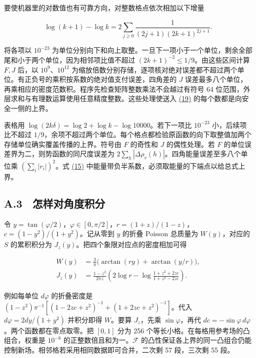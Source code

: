 \documentclass[11pt,a4paper]{article}
\begin{document}
要使机器里的对数值也有可靠方向，对整数格点依次相加以下增量

\[
 \log(k+1)-\log k=2\sum_{j\ge0}\frac{1}{(2j+1)(2k+1)^{2j+1}}.
\]

将各项以 \(10^{-23}\) 为单位分别向下和向上取整。一旦下一项小于一个单位，剩余全部尾和小于两个单位，因为相邻项比值不超过 \((2k+1)^{-2}\le1/9\)。由这些区间计算 \(F,J\) 后，以 \(10^9\)、\(10^{12}\) 为缩放倍数分别存储，逐项核对绝对误差都不超过两个单位。有正负号的乘积按系数的绝对值支付误差，四角差的 \(J\) 误差最多八个单位，再乘相应的密度范数积。程序先检查矩阵整数乘法不会越过有符号 64 位范围，外层求和与有理数运算使用任意精度整数。这些处理使送入 \hyperref[eq:19]{(19)} 的每个数都是向安全一侧的上界。

表格用 \(\log(2k\delta)=\log2+\log k-\log10000\)。若下一项比 \(10^{-23}\) 小，后续项比不超过 \(1/9\)，余项不超过两个单位。每个格点都检验原函数的向下取整值加两个存储单位确实覆盖传播的上界。符号由 \(F\) 的奇性和 \(J\) 的偶性处理。若 \(F\) 的单位误差界为二，则势函数的同尺度误差为 \(2\sum_h|\Delta\rho_v(h)|\)。四角能量误差至多八个单位乘 \((\sum_i|r_i|)^2\)。式 \hyperref[eq:15]{(15)} 中能量带负半系数，必须取能量的下端点以给总式上界。

\subsection{A.3　怎样对角度积分}\label{a.3-ux600eux6837ux5bf9ux89d2ux5ea6ux79efux5206}

令 \(y=\tan(\varphi/2)\)，\(\varphi\in[0,\pi/2]\)，\(r=(1+z)/(1-z)\)，\(c=(1-y^2)/(1+y^2)\)。记从零到 \(y\) 的折叠 Poisson 总质量为 \(W(y)\)，对应的 \(S\) 的累积积分为 \(J_z(y)\)。把四个象限对应点的密度相加可得

\[
 \begin{aligned}
 W(y)&=\frac2\pi\big(\arctan(ry)+\arctan(y/r)\big),\\
 J_z(y)&=\frac{1-z^2}{2\pi z}\left(2\log r-
            \log\frac{1+z^2+2zc}{1+z^2-2zc}\right).
 \end{aligned}                                                            \tag{27}\label{eq:27}
\]

例如每单位 \(d\varphi\) 的折叠密度是 \((1-z^2)\pi^{-1}[(1-2zc+z^2)^{-1}+(1+2zc+z^2)^{-1}]\)。代入 \(d\varphi=2dy/(1+y^2)\) 并积分即得 \(W\)。要算 \(J_z\)，先乘 \(\sin\varphi\)，再代 \(dc=-\sin\varphi\,d\varphi\)。两个函数都在零点取零。把 \([0,1]\) 分为 256 个等长小格。在每格用参考场的凸组合，权重是 \(10^{-8}\) 的正整数倍且和为一。\(\mathcal F\) 的凸性保证各上界的同一凸组合仍能控制新场。相邻格若采用相同数据即可合并，二次剩 57 段，三次剩 55 段。
\end{document}
